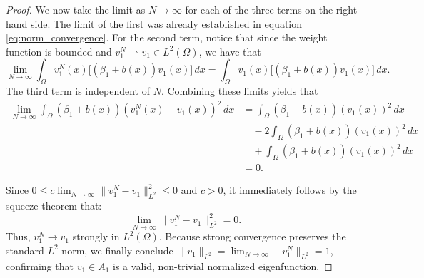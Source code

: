 \documentclass[12pt, a4paper]{article}
\theoremstyle{break}
\theoremstyle{break}
\theoremstyle{break}
\theoremstyle{break}
\theoremstyle{break}
\theoremstyle{break}
\theoremstyle{break}
\theoremstyle{break}
\theoremstyle{break}
\begin{document}
\begin{proof}
    We now take the limit as $N \to \infty$ for each of the three terms on the right-hand side. The limit of the first was already established in equation \eqref{eq:norm_convergence}. For the second term, notice that since the weight function is bounded  and $v_1^N \rightharpoonup v_1 \in L^2(\Omega)$, we have that
    \begin{equation}
        \lim_{N \to \infty} \int_\Omega v_1^N(x) \big[ (\beta_1 + b(x)) v_1(x) \big] \, dx = \int_\Omega v_1(x) \big[ (\beta_1 + b(x)) v_1(x) \big] \, dx.
    \end{equation}
    The third term is independent of $N$. Combining these limits yields that
    \begin{align}
        \lim_{N \to \infty} \int_\Omega (\beta_1 + b(x))(v_1^N(x) - v_1(x))^2 \, dx 
        &= \int_\Omega (\beta_1 + b(x))(v_1(x))^2 \, dx \nonumber \\
        &\quad - 2 \int_\Omega (\beta_1 + b(x))(v_1(x))^2 \, dx \nonumber \\
        &\quad + \int_\Omega (\beta_1 + b(x))(v_1(x))^2 \, dx \nonumber \\
        &= 0.
    \end{align}
    
    Since $0 \leq c \lim_{N \to \infty} \|v_1^N - v_1\|_{L^2}^2 \leq 0$ and $c > 0$, it immediately follows by the squeeze theorem that:
    \begin{equation}
        \lim_{N \to \infty} \|v_1^N - v_1\|_{L^2}^2 = 0.
    \end{equation}
    Thus, $v_1^N \to v_1$ strongly in $L^2(\Omega)$. Because strong convergence preserves the standard $L^2$-norm, we finally conclude $\|v_1\|_{L^2} = \lim_{N \to \infty} \|v_1^N\|_{L^2} = 1$, confirming that $v_1 \in A_1$ is a valid, non-trivial normalized eigenfunction.
\end{proof}
\end{document}
